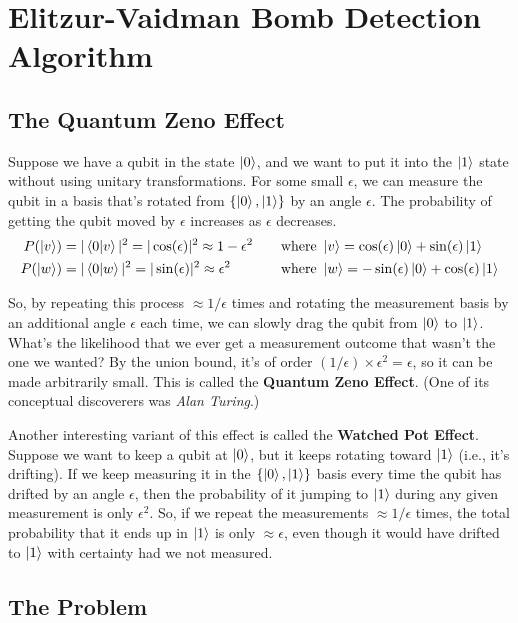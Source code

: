 \chapter{Elitzur-Vaidman Bomb Detection Algorithm}
\section{The Quantum Zeno Effect}

Suppose we have a qubit in the state $\ket{0}$, and we want to put it into the $\ket{1}$ state without using unitary transformations. For some small $\epsilon$, we can measure the qubit in a basis that's rotated from $\{\ket{0}, \ket{1}\}$ by an angle $\epsilon$. The probability of getting the qubit moved by $\epsilon$ increases as $\epsilon$ decreases.
\begin{align*}
P(\ket{v}) &= |\braket{0|v}|^2 = |\cos (\epsilon)|^2 \approx 1 - \epsilon^2 \quad && \text{where } \ket{v} = \cos(\epsilon) \ket{0} + \sin(\epsilon)\ket{1} \\
P(\ket{w}) &= |\braket{0|w}|^2 = |\sin (\epsilon)|^2 \approx \epsilon^2 \quad && \text{where } \ket{w} = -\sin(\epsilon) \ket{0} + \cos(\epsilon)\ket{1}
\end{align*}

So, by repeating this process $\approx 1/\epsilon$ times and rotating the measurement basis by an additional angle $\epsilon$ each time, we can slowly drag the qubit from $\ket{0}$ to $\ket{1}$. What's the likelihood that we ever get a measurement outcome that wasn't the one we wanted? By the union bound, it's of order $(1/\epsilon) \times \epsilon^2 = \epsilon$, so it can be made arbitrarily small. This is called the \textbf{Quantum Zeno Effect}. (One of its conceptual discoverers was \textit{Alan Turing}.)

Another interesting variant of this effect is called the \textbf{Watched Pot Effect}. Suppose we want to keep a qubit at $\ket{0}$, but it keeps rotating toward $\ket{1}$ (i.e., it's drifting). If we keep measuring it in the $\{\ket{0}, \ket{1}\}$ basis every time the qubit has drifted by an angle $\epsilon$, then the probability of it jumping to $\ket{1}$ during any given measurement is only $\epsilon^2$. So, if we repeat the measurements $\approx 1/\epsilon$ times, the total probability that it ends up in $\ket{1}$ is only $\approx \epsilon$, even though it would have drifted to $\ket{1}$ with certainty had we not measured.

\section{The Problem}


